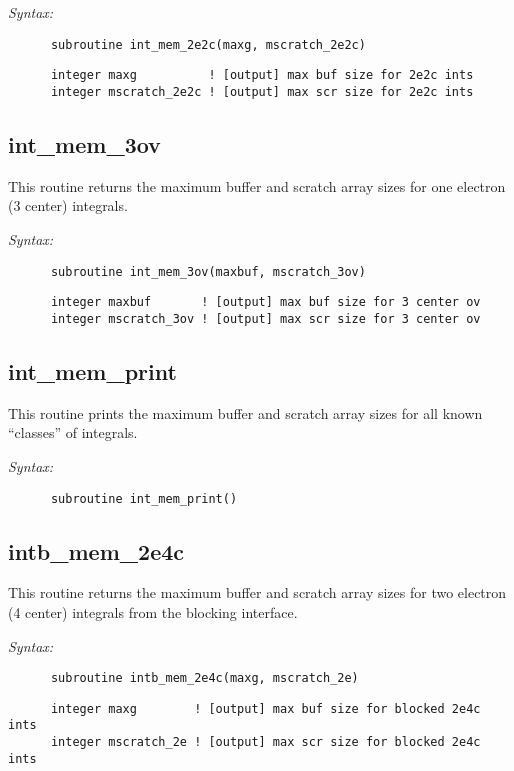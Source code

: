 {\it Syntax:} 
\begin{verbatim} 
      subroutine int_mem_2e2c(maxg, mscratch_2e2c) 
\end{verbatim} 
\begin{verbatim} 
      integer maxg          ! [output] max buf size for 2e2c ints 
      integer mscratch_2e2c ! [output] max scr size for 2e2c ints 
\end{verbatim} 
\subsection{int\_mem\_3ov} 
This routine returns the maximum buffer and scratch array 
sizes for one electron (3 center) 
integrals. 
 
{\it Syntax:} 
\begin{verbatim} 
      subroutine int_mem_3ov(maxbuf, mscratch_3ov) 
\end{verbatim} 
\begin{verbatim} 
      integer maxbuf       ! [output] max buf size for 3 center ov 
      integer mscratch_3ov ! [output] max scr size for 3 center ov 
\end{verbatim} 
\subsection{int\_mem\_print} 
This routine prints the maximum buffer and scratch array 
sizes for all known ``classes'' of integrals. 
 
{\it Syntax:} 
\begin{verbatim} 
      subroutine int_mem_print() 
\end{verbatim} 
\subsection{intb\_mem\_2e4c} 
This routine returns the maximum buffer and scratch array 
sizes for two electron (4 center) 
integrals from the blocking interface. 
 
{\it Syntax:} 
\begin{verbatim} 
      subroutine intb_mem_2e4c(maxg, mscratch_2e) 
\end{verbatim} 
\begin{verbatim} 
      integer maxg        ! [output] max buf size for blocked 2e4c ints 
      integer mscratch_2e ! [output] max scr size for blocked 2e4c ints 
\end{verbatim} 

